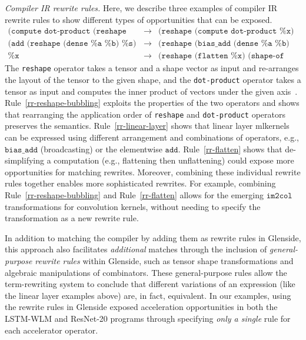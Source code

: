 \textit{Compiler IR rewrite rules.} Here, we describe three examples of compiler IR rewrite rules to show different types of opportunities that can be exposed.
%
\footnotesize
\begin{eqnarray} 
  \texttt{(compute dot-product (reshape \%x \%s))} &\rightarrow& \texttt{(reshape (compute dot-product \%x) \%s)} \label{rr-reshape-bubbling} \\
  \texttt{(add (reshape (dense \%a \%b) \%s) \%c)} &\rightarrow& \texttt{(reshape (bias\_add (dense \%a \%b) \%c) \%s)} \label{rr-linear-layer} \\
  \texttt{\%x} &\rightarrow& \texttt{(reshape (flatten \%x) (shape-of \%x))} \label{rr-flatten}
\end{eqnarray}
\normalsize
%
The \texttt{reshape} operator takes a tensor and a shape vector as input and re-arranges the layout of the tensor to the given shape, and the \texttt{dot-product} operator takes a tensor as input and computes the inner product of vectors under the given axis~\cite{smith2021pure}. Rule~\ref{rr-reshape-bubbling} exploits the properties of the two operators and shows that rearranging the application order of \texttt{reshape} and \texttt{dot-product} operators
  preserves the semantics.
Rule~\ref{rr-linear-layer} shows that linear layer \glspl{mlkernel} can be expressed 
  using different arrangement and combinations of operators, e.g., $\texttt{bias\_add}$ (broadcasting) or the 
  elementwise $\texttt{add}$.
Rule~\ref{rr-flatten} shows that de-simplifying a computation 
  (e.g., flattening then unflattening) could expose more opportunities for matching 
  rewrites.
Moreover, combining these individual rewrite rules together enables more 
  sophisticated rewrites. 
For example, combining Rule~\ref{rr-reshape-bubbling} and Rule~\ref{rr-flatten} 
  allows for the emerging $\texttt{im2col}$ transformations for convolution kernels, 
  without needing to specify the transformation as a new rewrite rule.

\iffalse
In addition to matching the compiler \mapping by adding them as rewrite rules 
  in Glenside, this approach also facilitates \emph{additional} matches through 
  the inclusion of \textit{general-purpose rewrite rules} within Glenside, such 
  as tensor shape transformations and algebraic manipulations of combinators.
These general-purpose rules
  allow the term-rewriting system to conclude
  that different variations of an expression
  (like the linear layer examples above)
  are, in fact, equivalent.
In our examples, using the rewrite rules in Glenside
  exposed acceleration opportunities in both
  the LSTM-WLM and ResNet-20 programs
  through specifying \textit{only a single}
  \mapping rule for each accelerator operator.

